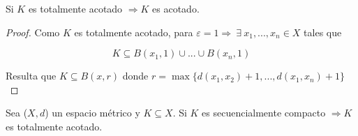\begin{theorem} \label{theom442}
    Si $K$ es totalmente acotado $\Rightarrow K$ es acotado.
\end{theorem}

\begin{proof}
    Como $K$ es totalmente acotado, para $\varepsilon = 1 \Rightarrow \: \exists \: x_1, ..., x_n \in X$ tales que

    $$ K \subseteq B(x_1, 1) \cup ... \cup B(x_n, 1) $$

    Resulta que $K \subseteq B(x,r)$ donde $r = \max \{ d(x_1,x_2) + 1, ..., d(x_1, x_n) + 1 \}$
\end{proof}

\begin{theorem} \label{theom441}
    Sea ($X,d$) un espacio métrico y $K \subseteq X$. Si $K$ es secuencialmente compacto $\Rightarrow K$ es totalmente acotado.
\end{theorem}

